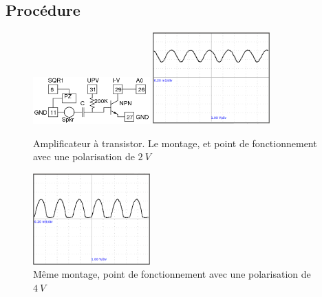 \documentclass{book}
\begin{document}
\subsection{Procédure}


\begin{figure}[h!]
\begin{center}
\caption{\label{fig:Transistor-amplifier-at}Amplificateur à transistor. Le montage, et point de fonctionnement avec une polarisation de $2\ V$ }\vspace{0.5em}
\includegraphics[width=0.4\textwidth, height=0.3\textwidth, keepaspectratio]{Schematic-tran-amp.png}
\includegraphics[width=0.4\textwidth, height=0.3\textwidth, keepaspectratio]{Pic-tran-amp2V.png}
\end{center}
\end{figure}



\begin{figure}[h!]
\begin{center}
\caption{\label{fig:Transistor-amplifier-at2}Même montage, point de fonctionnement avec une polarisation de $4\ V$ }\vspace{0.5em}
\includegraphics[width=0.4\textwidth, height=0.3\textwidth, keepaspectratio]{Pic-tran-amp4V.png}
\end{center}
\end{figure}
\end{document}
